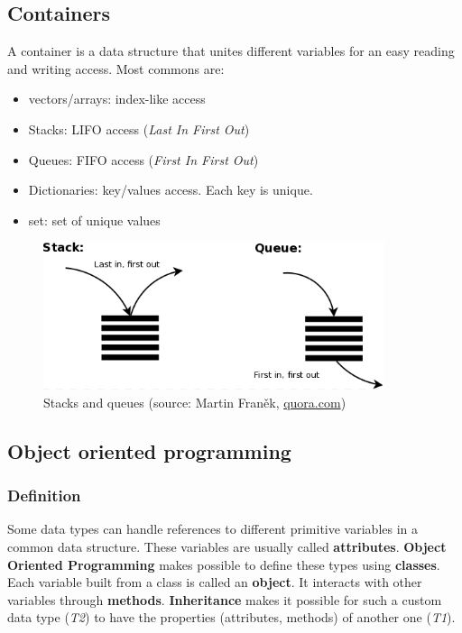 \documentclass[11pt]{article}
\begin{document}
		\subsection{Containers}
			A container is a data structure that unites different variables for an easy reading and writing access.
			Most commons are:
			\begin{itemize}
				\item vectors/arrays: index-like access
				\item Stacks: LIFO access (\textit{Last In First Out})
				\item Queues: FIFO access (\textit{First In First Out})
				\item Dictionaries: key/values access. Each key is unique.
				\item set: set of unique values
			\end{itemize}
			\begin{figure}[h!]
				\begin{center}
					\includegraphics[width=10cm]{figures/FIFO_LIFO.png}
					\caption{Stacks and queues
					\scriptsize{ (source: Martin Franěk, \url{quora.com})}}
				\end{center}
			\end{figure}

		\subsection{Object oriented programming}

			\subsubsection{Definition}
				Some data types can handle references to different primitive variables in a common data structure. These variables are usually called \textbf{attributes}.
				\textbf{Object Oriented Programming} makes possible to define these types using \textbf{
		classes}. Each variable built from a class is called an \textbf{object}. It interacts with other variables through \textbf{methods}.
				\textbf{Inheritance} makes it possible for such a custom data type (\textit{T2}) to have the properties (attributes, methods) of another one (\textit{T1}).
\end{document}
